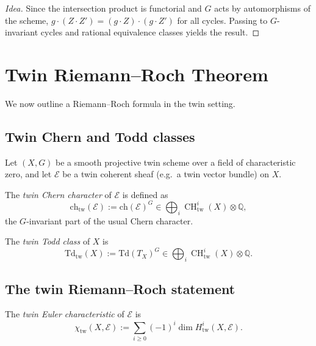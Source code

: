 \documentclass[11pt,a4paper]{article}
\numberwithin{equation}{section}
\newcommand{\Q}{\mathbb{Q}}
\DeclareMathOperator{\CH}{CH}
\newcommand{\Ecal}{\mathcal{E}}
\begin{document}
	\begin{proof}[Idea]
		Since the intersection product is functorial and $G$ acts by automorphisms of the scheme, 
		$g\cdot(Z\cdot Z')=(g\cdot Z)\cdot(g\cdot Z')$ for all cycles.
		Passing to $G$-invariant cycles and rational equivalence classes yields the result.
	\end{proof}
	
	\section{Twin Riemann--Roch Theorem}
	\label{sec:riemann-roch}
	
	We now outline a Riemann--Roch formula in the twin setting.
	
	\subsection{Twin Chern and Todd classes}
	
	Let $(X,G)$ be a smooth projective twin scheme over a field of characteristic zero, and let $\Ecal$ be a twin coherent
	sheaf (e.g.\ a twin vector bundle) on $X$.
	
	\begin{definition}
		The \emph{twin Chern character} of $\Ecal$ is defined as
		\[
		\mathrm{ch}_{\mathrm{tw}}(\Ecal) := \mathrm{ch}(\Ecal)^G \in \bigoplus_i \CH^i_{\mathrm{tw}}(X)\otimes\Q,
		\]
		the $G$-invariant part of the usual Chern character.
	\end{definition}
	
	\begin{definition}
		The \emph{twin Todd class} of $X$ is
		\[
		\mathrm{Td}_{\mathrm{tw}}(X) := \mathrm{Td}(T_X)^G \in \bigoplus_i \CH^i_{\mathrm{tw}}(X)\otimes\Q.
		\]
	\end{definition}
	
	\subsection{The twin Riemann--Roch statement}
	
	\begin{definition}
		The \emph{twin Euler characteristic} of $\Ecal$ is
		\[
		\chi_{\mathrm{tw}}(X,\Ecal) := \sum_{i\ge 0} (-1)^i \dim H^i_{\mathrm{tw}}(X,\Ecal).
		\]
	\end{definition}
	
\end{document}
